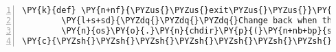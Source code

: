 \begin{Verbatim}[commandchars=\\\{\},fontsize=\small,numbers=left,firstnumber=1,stepnumber=2,firstline=2]
    \PY{k}{def} \PY{n+nf}{\PYZus{}\PYZus{}exit\PYZus{}\PYZus{}}\PY{p}{(}\PY{n+nb+bp}{self}\PY{p}{,} \PY{n}{etype}\PY{p}{,} \PY{n}{value}\PY{p}{,} \PY{n}{traceback}\PY{p}{)}\PY{p}{:}
        \PY{l+s+sd}{\PYZdq{}\PYZdq{}\PYZdq{}Change back when the class is exited\PYZdq{}\PYZdq{}\PYZdq{}}
        \PY{n}{os}\PY{o}{.}\PY{n}{chdir}\PY{p}{(}\PY{n+nb+bp}{self}\PY{o}{.}\PY{n}{savedPath}\PY{p}{)}
\PY{c}{\PYZsh{}\PYZsh{}\PYZsh{}\PYZsh{}\PYZsh{}\PYZsh{}\PYZsh{}\PYZsh{}\PYZsh{}\PYZsh{}\PYZsh{}\PYZsh{}\PYZsh{}\PYZsh{}\PYZsh{}\PYZsh{}\PYZsh{}\PYZsh{}\PYZsh{}\PYZsh{}\PYZsh{}\PYZsh{}\PYZsh{}\PYZsh{}\PYZsh{}\PYZsh{}\PYZsh{}\PYZsh{}\PYZsh{}\PYZsh{}\PYZsh{}\PYZsh{}\PYZsh{}\PYZsh{}\PYZsh{}\PYZsh{}\PYZsh{}\PYZsh{}\PYZsh{}\PYZsh{}\PYZsh{}\PYZsh{}\PYZsh{}\PYZsh{}\PYZsh{}\PYZsh{}\PYZsh{}\PYZsh{}\PYZsh{}\PYZsh{}\PYZsh{}\PYZsh{}\PYZsh{}\PYZsh{}\PYZsh{}\PYZsh{}\PYZsh{}\PYZsh{}\PYZsh{}\PYZsh{}\PYZsh{}\PYZsh{}\PYZsh{}\PYZsh{}\PYZsh{}\PYZsh{}\PYZsh{}\PYZsh{}\PYZsh{}\PYZsh{}\PYZsh{}\PYZsh{}\PYZsh{}\PYZsh{}\PYZsh{}\PYZsh{}\PYZsh{}\PYZsh{}\PYZsh{}}
\end{Verbatim}
